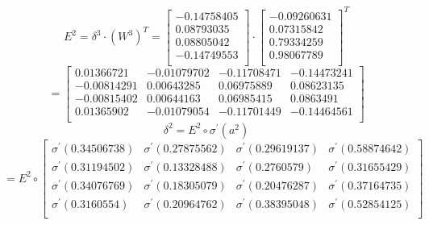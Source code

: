 \documentclass[a4paper,12pt,oneside]{book}
\begin{document}
\begin{enumerate}
    \begin{equation*}
        E^2 = \delta^3 \cdot (W^3)^T
        =\begin{bmatrix}
            -0.14758405\\
            0.08793035\\
            0.08805042\\
            -0.14749553\\
        \end{bmatrix} \cdot
        \begin{bmatrix}
            -0.09260631\\
            0.07315842\\
            0.79334259\\
            0.98067789\\
        \end{bmatrix} ^T
    \end{equation*}
    \begin{equation*}
        = \begin{bmatrix}
            0.01366721 & -0.01079702 & -0.11708471 & -0.14473241\\
            -0.00814291 & 0.00643285 & 0.06975889 & 0.08623135\\
            -0.00815402 & 0.00644163 & 0.06985415 & 0.0863491\\
            0.01365902 & -0.01079054 & -0.11701449 & -0.14464561\\
        \end{bmatrix}
    \end{equation*}
    \begin{equation*}
        \delta^2 = E^2 \circ \sigma^{'}(a^2)
    \end{equation*}
    \begin{equation*}
        =E^2 \circ
        \begin{bmatrix}
            \sigma^{'}(0.34506738) & \sigma^{'}(0.27875562) & \sigma^{'}(0.29619137) & \sigma^{'}(0.58874642)\\
            \sigma^{'}(0.31194502) & \sigma^{'}(0.13328488) & \sigma^{'}(0.2760579) & \sigma^{'}(0.31655429)\\
            \sigma^{'}(0.34076769) & \sigma^{'}(0.18305079) & \sigma^{'}(0.20476287) & \sigma^{'}(0.37164735)\\
            \sigma^{'}(0.3160554) & \sigma^{'}(0.20964762) & \sigma^{'}(0.38395048) & \sigma^{'}(0.52854125)\\
        \end{bmatrix}
    \end{equation*}

\end{enumerate}
\end{document}
